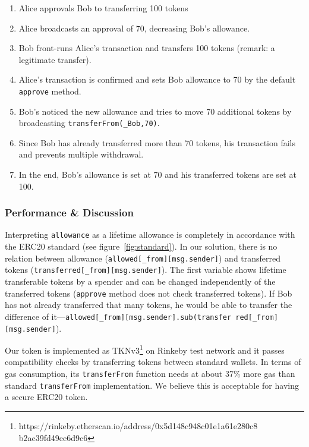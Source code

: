 \begin{enumerate}
	\item Alice approvals Bob to transferring 100 tokens
	\item Alice broadcasts an approval of 70, decreasing Bob's allowance.
	\item Bob front-runs Alice’s transaction and transfers 100 tokens (remark: a legitimate transfer).
	\item Alice's transaction is confirmed and sets Bob allowance to 70 by the default \texttt{approve} method.
	\item Bob's noticed the new allowance and tries to move 70 additional tokens by broadcasting \texttt{transferFrom(\_Bob,70)}. 
	\item Since Bob has already transferred more than 70 tokens, his transaction fails and prevents multiple withdrawal. 
	\item In the end, Bob’s allowance is set at 70 and his transferred tokens are set at 100.
\end{enumerate}

\subsubsection*{Performance \& Discussion} Interpreting \texttt{allowance} as a lifetime allowance is completely in accordance with the ERC20 standard (see figure~\ref{fig:standard}). In our solution, there is no relation between allowance (\texttt{allowed[\_from][msg.sender]}) and transferred tokens (\texttt{transferred[\_from][msg.sender]}). The first variable shows lifetime transferable tokens by a spender and can be changed independently of the transferred tokens (\ie \texttt{approve} method does not check transferred tokens). If Bob has not already transferred that many tokens, he would be able to transfer the difference of it---\texttt{allowed[\_from][msg.sender].sub(transfer red[\_from][msg.sender]}). 

Our token is implemented as TKNv3\footnote{https://rinkeby.etherscan.io/address/0x5d148c948c01e1a61e280c8 b2ac39fd49ee6d9c6} on Rinkeby test network and it passes compatibility checks by transferring tokens between standard wallets. In terms of gas consumption, its \texttt{transferFrom} function needs at about 37\% more gas than standard \texttt{transferFrom} implementation. We believe this is acceptable for having a secure ERC20 token.

